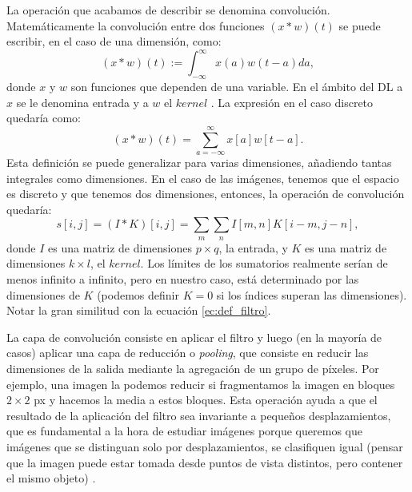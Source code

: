 \documentclass[a4paper,12pt,oneside,titlepage]{book}
\begin{document}
La operación que acabamos de describir se denomina convolución. Matemáticamente la convolución entre dos funciones $(x * w)(t)$ se puede escribir, en el caso de una dimensión, como:
\begin{equation}
  (x * w)(t):=\int_{-\infty}^{\infty} x(a) w(t-a) d a,
\end{equation}
donde $x$ y $w$ son funciones que dependen de una variable. En el ámbito del DL a $x$ se le denomina entrada y a $w$ el $kernel$ \cite{dl_book}. La expresión en el caso discreto quedaría como:
\begin{equation}
  (x * w)(t)=\sum_{a=-\infty}^{\infty} x[a] w[t-a].
  \end{equation}
Esta definición se puede generalizar para varias dimensiones, añadiendo tantas integrales como dimensiones. En el caso de las imágenes, tenemos que el espacio es discreto y que tenemos dos dimensiones, entonces, la operación de convolución quedaría:
\begin{equation}
  s[i, j]=(I * K)[i, j]=\sum_{m} \sum_{n} I[m, n] K[i-m, j-n],
\end{equation}
donde $I$ es una matriz de dimensiones $p\times q$, la entrada, y $K$ es una matriz de dimensiones $k\times l$, el $kernel$. Los límites de los sumatorios realmente serían de menos infinito a infinito, pero en nuestro caso, está determinado por las dimensiones de $K$ (podemos definir $K = 0$ si los índices superan las dimensiones). Notar la gran similitud con la ecuación \ref{ec:def_filtro}.


La capa de convolución consiste en aplicar el filtro y luego (en la mayoría de casos) aplicar una capa de reducción o \textit{pooling}, que consiste en reducir las dimensiones de la salida mediante la agregación de un grupo de píxeles. Por ejemplo, una imagen la podemos reducir si fragmentamos la imagen en bloques $2\times 2$ px y hacemos la media a estos bloques. Esta operación ayuda a que el resultado de la aplicación del filtro sea invariante a pequeños desplazamientos, que es fundamental a la hora de estudiar imágenes porque queremos que imágenes que se distinguan solo por desplazamientos, se clasifiquen igual (pensar que la imagen puede estar tomada desde puntos de vista distintos, pero contener el mismo objeto) \cite{dl_book}.
\end{document}
